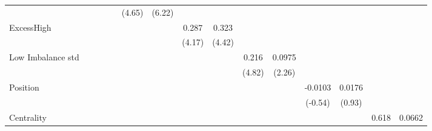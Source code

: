 {\begin{tabular}{l*{14}{c}}
                &                  &                  &                  &                  &   (4.65)         &   (6.22)         &                  &                  &                  &                  &                  &                  &                  &                  \\
[1em]
ExcessHigh      &                  &                  &                  &                  &                  &                  &    0.287\sym{***}&    0.323\sym{***}&                  &                  &                  &                  &                  &                  \\
                &                  &                  &                  &                  &                  &                  &   (4.17)         &   (4.42)         &                  &                  &                  &                  &                  &                  \\
[1em]
Low Imbalance std&                  &                  &                  &                  &                  &                  &                  &                  &    0.216\sym{***}&   0.0975\sym{*}  &                  &                  &                  &                  \\
                &                  &                  &                  &                  &                  &                  &                  &                  &   (4.82)         &   (2.26)         &                  &                  &                  &                  \\
[1em]
Position        &                  &                  &                  &                  &                  &                  &                  &                  &                  &                  &  -0.0103         &   0.0176         &                  &                  \\
                &                  &                  &                  &                  &                  &                  &                  &                  &                  &                  &  (-0.54)         &   (0.93)         &                  &                  \\
[1em]
Centrality      &                  &                  &                  &                  &                  &                  &                  &                  &                  &                  &                  &                  &    0.618\sym{***}&   0.0662         \\

\end{tabular}}
